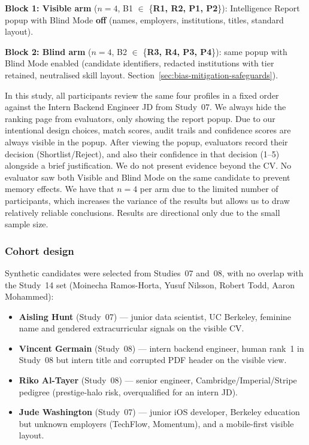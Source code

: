 \textbf{Block 1: Visible arm} ($n = 4$, B1 $\in$ \{\textbf{R1, R2, P1, P2}\}): Intelligence Report popup with Blind Mode \textbf{off} (names, employers, institutions, titles, standard layout).

\textbf{Block 2: Blind arm} ($n = 4$, B2 $\in$ \{\textbf{R3, R4, P3, P4}\}): same popup with Blind Mode enabled (candidate identifiers, redacted institutions with tier retained, neutralised skill layout. Section~\ref{sec:bias-mitigation-safeguards}).

In this study, all participants review the same four profiles in a fixed order against the Intern Backend Engineer JD from Study~07.
We always hide the ranking page from evaluators, only showing the report popup. Due to our intentional design choices, match scores,
audit trails and confidence scores are always visible in the popup. After viewing the popup, evaluators record their decision (Shortlist/Reject),
and also their confidence in that decision (1--5) alongside a brief justification. We do not present evidence beyond the CV. No
evaluator saw both Visible and Blind Mode on the same candidate to prevent memory effects.
We have that $n = 4$ per arm due to the limited number of participants, which increases the variance of the results
but allows us to draw relatively reliable conclusions. Results are directional only due to the small sample size.

\subsubsection{Cohort design}
Synthetic candidates were selected from Studies~07 and~08, with no overlap with the Study~14 set 
(Moinecha Ramos-Horta, Yusuf Nilsson, Robert Todd, Aaron Mohammed):
\begin{itemize}
    \item \textbf{Aisling Hunt} (Study~07) --- junior data scientist, UC Berkeley, feminine name and gendered extracurricular signals on the visible CV.
    \item \textbf{Vincent Germain} (Study~08) --- intern backend engineer, human rank~1 in Study~08 but intern title and corrupted PDF header on the visible view.
    \item \textbf{Riko Al-Tayer} (Study~08) --- senior engineer, Cambridge/Imperial/Stripe pedigree (prestige-halo risk, overqualified for an intern JD).
    \item \textbf{Jude Washington} (Study~07) --- junior iOS developer, Berkeley education but unknown employers (TechFlow, Momentum), and a mobile-first visible layout.
\end{itemize}

